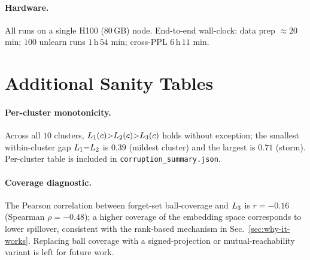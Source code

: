 \paragraph{Hardware.} All runs on a single H100 (80\,GB) node. End-to-end wall-clock: data prep $\approx 20$ min; $100$ unlearn runs $1$\,h\,$54$ min; cross-PPL $6$\,h\,$11$ min.

\section{Additional Sanity Tables}
\label{app:tables}

\paragraph{Per-cluster monotonicity.} Across all $10$ clusters, $L_1(c){>}L_2(c){>}L_3(c)$ holds without exception; the smallest within-cluster gap $L_1{-}L_2$ is $0.39$ (mildest cluster) and the largest is $0.71$ (storm). Per-cluster table is included in \texttt{corruption\_summary.json}.

\paragraph{Coverage diagnostic.} The Pearson correlation between forget-set ball-coverage and $L_3$ is $r{=}{-}0.16$ (Spearman $\rho{=}{-}0.48$); a higher coverage of the embedding space corresponds to lower spillover, consistent with the rank-based mechanism in Sec.~\ref{sec:why-it-works}. Replacing ball coverage with a signed-projection or mutual-reachability variant is left for future work.
